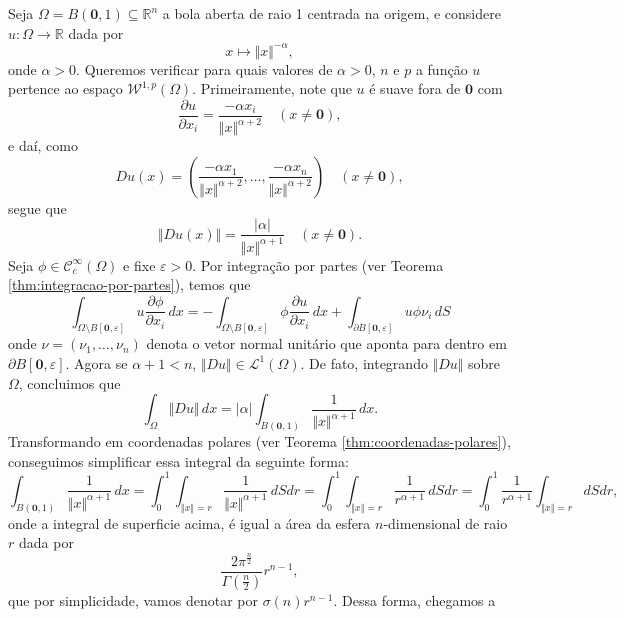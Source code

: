 \documentclass[a4paper, 11pt]{book}
\theoremstyle{definition}
\newcommand{\bR}{\mathbb{R}}
\newcommand{\cC}{\mathcal{C}}
\newcommand{\cL}{\mathcal{L}}
\newcommand{\cW}{\mathcal{W}}
\begin{document}
\begin{ex}
    Seja $\Omega = B(\mathbf{0},1) \subseteq \bR^n$ a bola aberta de raio 1 centrada na origem, e considere $u : \Omega \to \bR$ dada por
    \begin{equation} \label{eq:po}
        x \mapsto \Vert x \Vert^{-\alpha},
    \end{equation}
    onde $\alpha > 0$. Queremos verificar para quais valores de $\alpha > 0$, $n$ e $p$ a função $u$ pertence ao espaço $\cW^{1,p}(\Omega)$.
    Primeiramente, note que $u$ é suave fora de $\mathbf{0}$ com
    \[
        \dfrac{\partial u}{\partial x_i} = \frac{-\alpha x_i}{\Vert x \Vert^{\alpha + 2}} \quad (x \neq \mathbf{0}),
    \]
    e daí, como
    \[
        Du(x) = \left(\frac{-\alpha x_1}{\Vert x \Vert^{\alpha + 2}},\dots,\frac{-\alpha x_n}{\Vert x \Vert^{\alpha + 2}}  \right) \quad (x \neq \mathbf{0}),
    \]
    segue que
    \[
        \Vert Du(x) \Vert = \frac{|\alpha|}{\Vert x \Vert^{\alpha + 1}} \quad (x \neq \mathbf{0}).
    \]
    Seja $\phi \in \cC^\infty_c(\Omega)$ e fixe $\varepsilon > 0$. Por integração por partes (ver Teorema \ref{thm:integracao-por-partes}), temos que
    \begin{equation} \label{eq:op}
        \int_{\Omega \setminus B[\mathbf{0}, \varepsilon]} u \dfrac{\partial \phi}{\partial x_i} \, dx = -\int_{\Omega \setminus B[\mathbf{0}, \varepsilon]} \phi \dfrac{\partial u}{\partial x_i} \,dx + \int_{\partial B[\mathbf{0},\varepsilon]} u \phi \nu_i \,dS
    \end{equation}
    onde $\nu = (\nu_1,\dots,\nu_n)$ denota o vetor normal unitário que aponta para dentro em $\partial B[\mathbf{0},\varepsilon]$.
    Agora se $\alpha + 1 < n$, $\Vert Du \Vert \in \cL^1(\Omega)$.
    De fato, integrando $\Vert Du \Vert$ sobre $\Omega$, concluimos que
    \[
        \int_\Omega \Vert Du \Vert \,dx = |\alpha|\int_{B(\mathbf{0},1)} \frac{1}{\Vert x \Vert^{\alpha+1}} \,dx.
    \]
    Transformando em coordenadas polares (ver Teorema \ref{thm:coordenadas-polares}), conseguimos simplificar essa integral da seguinte forma:
    \[
        \int_{B(\mathbf{0},1)} \frac{1}{\Vert x \Vert^{\alpha+1}} \,dx =  \int_0^1 \int_{\Vert x \Vert = r} \frac{1}{\Vert x \Vert^{\alpha + 1}} \,dS dr = \int_0^1 \int_{\Vert x \Vert= r} \frac{1}{r^{\alpha + 1}} \, dS dr = \int_0^1 \frac{1}{r^{\alpha+1}}  \int_{\Vert x \Vert = r} dS dr,
    \]
    onde a integral de superficie acima, é igual a área da esfera $n$-dimensional de raio $r$ dada por
    \[
        \frac{2\pi^{\frac{n}{2}}}{\Gamma(\frac{n}{2})}r^{n-1},
    \]
    que por simplicidade, vamos denotar por $\sigma(n) r^{n-1}$. Dessa forma, chegamos a

\end{ex}
\end{document}
